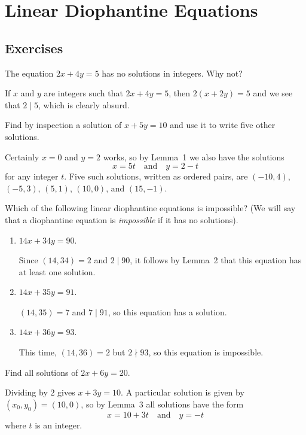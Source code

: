 \chapter{Linear Diophantine Equations}

\section{Exercises}

 The equation $2x + 4y = 5$ has no solutions in
integers. Why not?
\begin{solution}
  If $x$ and $y$ are integers such that $2x + 4y = 5$, then
  $2(x + 2y) = 5$ and we see that $2\mid5$, which is clearly absurd.
\end{solution}

 Find by inspection a solution of $x + 5y = 10$ and use it
to write five other solutions.
\begin{solution}
  Certainly $x = 0$ and $y = 2$ works, so by Lemma~1 we also have the
  solutions
  \begin{equation*}
    x = 5t \quad\text{and}\quad y = 2 - t
  \end{equation*}
  for any integer $t$. Five such solutions, written as ordered pairs,
  are $(-10,4)$, $(-5,3)$, $(5,1)$, $(10,0)$, and $(15,-1)$.
\end{solution}

 Which of the following linear diophantine equations is
impossible? (We will say that a diophantine equation is {\em
  impossible} if it has no solutions).
\begin{enumerate}
\item $14x + 34y = 90$.
  \begin{solution}
    Since $(14,34) = 2$ and $2\mid90$, it follows by Lemma~2 that this
    equation has at least one solution.
  \end{solution}
\item $14x + 35y = 91$.
  \begin{solution}
    $(14,35) = 7$ and $7\mid91$, so this equation has a solution.
  \end{solution}
\item $14x + 36y = 93$.
  \begin{solution}
    This time, $(14,36) = 2$ but $2\nmid93$, so this equation is
    impossible.
  \end{solution}
\end{enumerate}

 Find all solutions of $2x + 6y = 20$.
\begin{solution}
  Dividing by $2$ gives $x + 3y = 10$. A particular solution is given
  by $(x_0,y_0) = (10,0)$, so by Lemma~3 all solutions have the form
  \begin{equation*}
    x = 10 + 3t \quad\text{and}\quad y = -t
  \end{equation*}
  where $t$ is an integer.
\end{solution}

